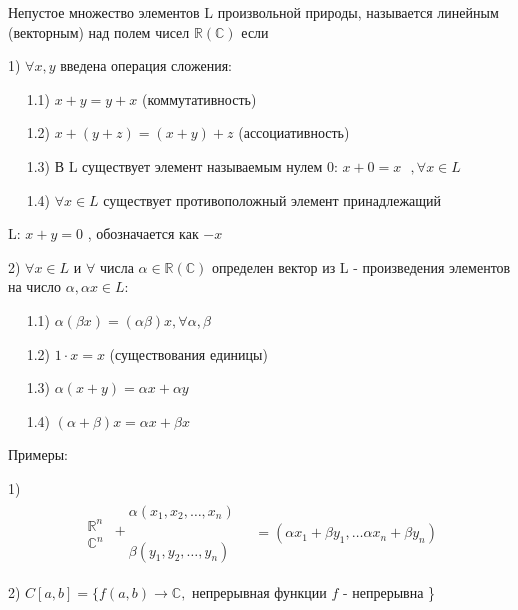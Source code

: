 \documentclass[12pt, a4paper]{report}
\begin{document}
\begin{definition}
    Непустое множество элементов L произвольной природы, называется линейным (векторным) над полем чисел \( \mathbb{R} (\mathbb{C})\) если 

    1) \( \forall x,y   \) введена операция сложения:

    \( \quad  \) 1.1)  \( x+y = y+x \) (коммутативность)
    
    \( \quad  \) 1.2) \( x+(y+z)= (x+y ) +z \) (ассоциативность)
    
    \( \quad  \) 1.3) В L существует элемент называемым нулем 0: \( x+0 = x \text{ }  , \forall x \in  L \)  

    \( \quad  \) 1.4) \( \forall x \in  L \)  существует противоположный элемент принадлежащий 
    
    L: \( x+y = 0 \) , обозначается как \( -x \)

    2) \( \forall x \in  L \)  и \( \forall  \) числа \( \alpha \in  \mathbb{R}(\mathbb{C}) \) определен вектор из L - произведения элементов на число \( \alpha , \alpha x \in  L \):
    
    \( \quad  \) 1.1) \( \alpha (\beta x )= (\alpha \beta )x  , \forall  \alpha, \beta  \)
    
    \( \quad  \) 1.2) \( 1 \cdot x =x  \) (существования единицы)
    
    \( \quad  \) 1.3) \( \alpha (x+y) = \alpha x + \alpha y \)

    \( \quad  \) 1.4) \( (\alpha + \beta )x = \alpha x + \beta x \) 


\end{definition}

Примеры: 

1)
\[ \begin{aligned}
\begin{array}{ll}
    \mathbb{R}^{n }\\
    \mathbb{C}^{n}  
\end{array}
\begin{array}{ll}
    \quad \alpha(x_1,x_2, \ldots, x_n) \\
    + \\
    \quad \beta (y_1,y_2, \ldots ,y_n )
\end{array}
\quad =(\alpha x_1 + \beta y_1 ,\dots \alpha x_n + \beta y_n)
\end{aligned} \] 

2) \( C[a,b] = \{f(a,b) \to  \mathbb{C}, \text{ непрерывная функции } f \text{ - непрерывна }   \)\}
\end{document}
